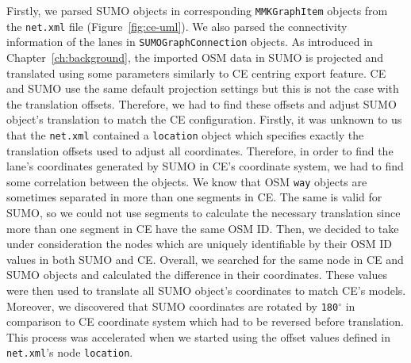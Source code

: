 Firstly, we parsed SUMO objects in corresponding \texttt{MMKGraphItem} objects from the \texttt{net.xml} file (Figure~\ref{fig:ce-uml}). We also parsed the connectivity information of the lanes in \texttt{SUMOGraphConnection} objects. As introduced in Chapter~\ref{ch:background}, the imported OSM data in SUMO is projected and translated using some parameters similarly to CE centring export feature. CE and SUMO use the same default projection settings but this is not the case with the translation offsets. Therefore, we had to find these offsets and adjust SUMO object's translation to match the CE configuration. Firstly, it was unknown to us that the \texttt{net.xml} contained a \texttt{location} object which specifies exactly the translation offsets used to adjust all coordinates. Therefore, in order to find the lane's coordinates generated by SUMO in CE's coordinate system, we had to find some correlation between the objects. We know that OSM \texttt{way} objects are sometimes separated in more than one segments in CE. The same is valid for SUMO, so we could not use segments to calculate the necessary translation since more than one segment in CE have the same OSM ID. Then, we decided to take under consideration the nodes which are uniquely identifiable by their OSM ID values in both SUMO and CE. Overall, we searched for the same node in CE and SUMO objects and calculated the difference in their coordinates. These values were then used to translate all SUMO object's coordinates to match CE's models. Moreover, we discovered that SUMO coordinates are rotated by \texttt{180$^{\circ}$} in comparison to CE coordinate system which had to be reversed before translation. This process was accelerated when we started using the offset values defined in \texttt{net.xml}'s node \texttt{location}.


